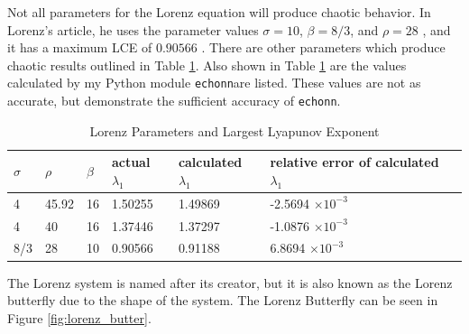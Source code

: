 \documentclass{article}
\newcommand{\echonn}{\texttt{echonn}}
\begin{document}
Not all parameters for the Lorenz equation will produce chaotic behavior. In
Lorenz's article, he uses the parameter values $\sigma=10$, $\beta=8/3$, and
$\rho=28$ \cite{lorenz1963deterministic}, and it has a maximum LCE of
$0.90566$ \cite{viswanath1998lyapunov}. There are other parameters which
produce chaotic results outlined in Table \ref{table:lorenz_params}. Also
shown in Table \ref{table:lorenz_params} are the values calculated by my
Python module \echonn are listed. These values are not as accurate, but
demonstrate the sufficient accuracy of \echonn.

\begin{table}[H]
    \centering
    \begin{tabular}{|l|l|l|l|l|l|l|}
        \hline
        $\sigma$ & $\rho$ & $\beta$ & actual $\lambda_1$ & calculated $\lambda_1$ & relative error of calculated $\lambda_1$ \\
        \hline \hline
        4 & 45.92 & 16 & 1.50255 & 1.49869 & -2.5694 $\times 10^{-3}$ \\ %
        4 & 40 & 16 & 1.37446 & 1.37297 & -1.0876 $\times 10^{-3}$ \\
        8/3 & 28 & 10 & 0.90566 & 0.91188 & 6.8694 $\times 10^{-3}$ \\
        \hline
    \end{tabular}
    \caption{
        Lorenz Parameters and Largest Lyapunov Exponent
        \cite{viswanath1998lyapunov}
    }
    \label{table:lorenz_params}
\end{table}

The Lorenz system is named after its creator, but it is also known as the
Lorenz butterfly due to the shape of the system. The Lorenz Butterfly can be
seen in Figure \ref{fig:lorenz_butter}.
\end{document}
